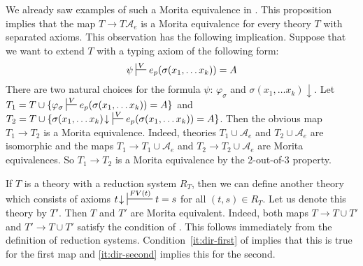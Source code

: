 \documentclass[reqno]{amsart}
\theoremstyle{definition}
\theoremstyle{remark}
\numberwithin{figure}{section}
\begin{document}
\begin{example}
We already saw examples of such a Morita equivalence in .
This proposition implies that the map $T \to T \mathcal{A}_e$ is a Morita equivalence for every theory $T$ with separated axioms.
This observation has the following implication.
Suppose that we want to extend $T$ with a typing axiom of the following form:
\[ \psi \sststile{}{V} e_p(\sigma(x_1, \ldots x_k)) = A \]
There are two natural choices for the formula $\psi$: $\varphi_\sigma$ and $\sigma(x_1, \ldots x_k)\!\downarrow$.
Let $T_1 = T \cup \{ \varphi_\sigma \sststile{}{V} e_p(\sigma(x_1, \ldots x_k)) = A \}$ and $T_2 = T \cup \{ \sigma(x_1, \ldots x_k)\!\downarrow\ \sststile{}{V} e_p(\sigma(x_1, \ldots x_k)) = A \}$.
Then the obvious map $T_1 \to T_2$ is a Morita equivalence.
Indeed, theories $T_1 \cup \mathcal{A}_e$ and $T_2 \cup \mathcal{A}_e$ are isomorphic and the maps $T_1 \to T_1 \cup \mathcal{A}_e$ and $T_2 \to T_2 \cup \mathcal{A}_e$ are Morita equivalences.
So $T_1 \to T_2$ is a Morita equivalence by the 2-out-of-3 property.
\end{example}

\begin{example}[directed]
If $T$ is a theory with a reduction system $R_T$, then we can define another theory which consists of axioms $t\!\downarrow\ \sststile{}{FV(t)} t = s$ for all $(t,s) \in R_T$.
Let us denote this theory by $T'$.
Then $T$ and $T'$ are Morita equivalent.
Indeed, both maps $T \to T \cup T'$ and $T' \to T \cup T'$ satisfy the condition of .
This follows immediately from the definition of reduction systems.
Condition~\eqref{it:dir-first} of  implies that this is true for the first map and \eqref{it:dir-second} implies this for the second.
\end{example}
\end{document}
